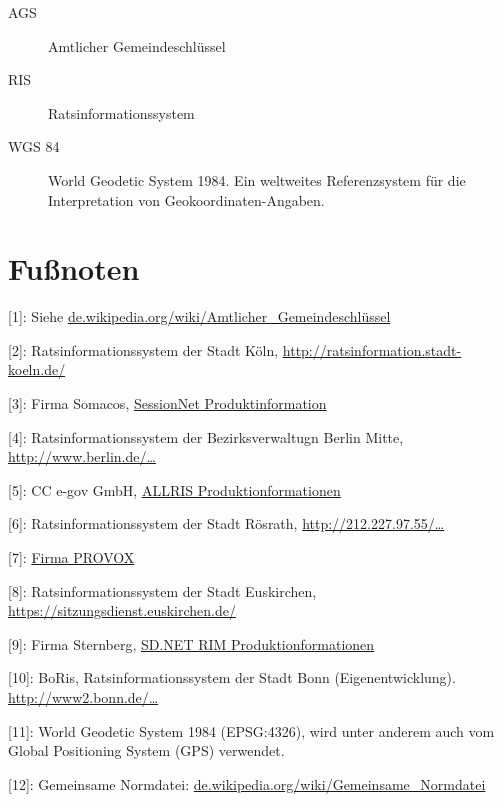 \documentclass[,a4paper]{article}
\begin{document}
\begin{description}
\item[AGS]
Amtlicher Gemeindeschlüssel
\item[RIS]
Ratsinformationssystem
\item[WGS 84]
World Geodetic System 1984. Ein weltweites Referenzsystem für die
Interpretation von Geokoordinaten-Angaben.
\end{description}

\section{Fußnoten}

{[}1{]}: Siehe
\href{http://de.wikipedia.org/wiki/Amtlicher\_Gemeindeschl\%C3\%BCssel}{de.wikipedia.org/wiki/Amtlicher\_Gemeindeschlüssel}

{[}2{]}: Ratsinformationssystem der Stadt Köln,
\href{http://ratsinformation.stadt-koeln.de/}{http://ratsinformation.stadt-koeln.de/}

{[}3{]}: Firma Somacos,
\href{http://www.somacos.de/de/sitzungsdienst/ratsinfo.html}{SessionNet
Produktinformation}

{[}4{]}: Ratsinformationssystem der Bezirksverwaltugn Berlin Mitte,
\href{http://www.berlin.de/ba-mitte/bvv-online/allris.net.asp}{http://www.berlin.de/\ldots{}}

{[}5{]}: CC e-gov GmbH, \href{http://www.cc-egov.de/allris.htm}{ALLRIS
Produktionformationen}

{[}6{]}: Ratsinformationssystem der Stadt Rösrath,
\href{http://212.227.97.55/ratsinfo/roesrath}{http://212.227.97.55/\ldots{}}

{[}7{]}: \href{http://www.provox.de/}{Firma PROVOX}

{[}8{]}: Ratsinformationssystem der Stadt Euskirchen,
\href{https://sitzungsdienst.euskirchen.de/}{https://sitzungsdienst.euskirchen.de/}

{[}9{]}: Firma Sternberg,
\href{http://www.sitzungsdienst.net/produkte/ratsinformationsmanagement}{SD.NET
RIM Produktionformationen}

{[}10{]}: BoRis, Ratsinformationssystem der Stadt Bonn
(Eigenentwicklung).
\href{http://www2.bonn.de/bo\_ris/ris\_sql/agm\_index.asp}{http://www2.bonn.de/\ldots{}}

{[}11{]}: World Geodetic System 1984 (EPSG:4326), wird unter anderem
auch vom Global Positioning System (GPS) verwendet.

{[}12{]}: Gemeinsame Normdatei:
\href{http://de.wikipedia.org/wiki/Gemeinsame\_Normdatei}{de.wikipedia.org/wiki/Gemeinsame\_Normdatei}
\end{document}
